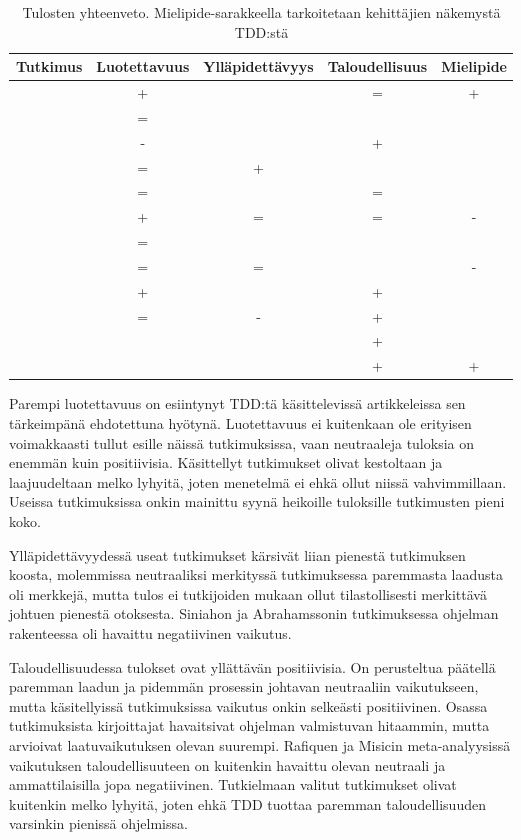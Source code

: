 \documentclass[finnish]{tktltiki2}
\theoremstyle{definition}
\theoremstyle{remark}
\begin{document}
\begin{table}
\begin{tabular}{ l  c  c  c  c}
\toprule
  Tutkimus & Luotettavuus & Ylläpidettävyys & Taloudellisuus & Mielipide \\
\midrule
\cite{George04} 	& + &  & = & + \\ 
\cite{Wilkerson12} 	& = &  &   &   \\ 
\cite{Erdogmus05} 	& - &  	& + &   \\ 
\cite{Causevic12} 	& = & + &   &   \\
\cite{Canfora06} 	& = &  & = &   \\ 
\cite{Pancur11} 	& + & = & = & - \\
\cite{Wilkerson12} 	& = &  &   &   \\ 
\cite{Munir14} 	& = & = &   & - \\ 
\cite{Nagappan08} 	& + &  & + &   \\ 
\cite{Siniaalto07} 	& = & - & + &   \\ 
\cite{Madeyski07} 	&   &   & + &   \\ 
\cite{Latorre14}	&   &   & + & + \\ 
\bottomrule
\end{tabular}
\caption{Tulosten yhteenveto. Mielipide-sarakkeella tarkoitetaan kehittäjien näkemystä TDD:stä}
\end{table}


Parempi luotettavuus on esiintynyt TDD:tä käsittelevissä artikkeleissa sen tärkeimpänä ehdotettuna hyötynä. Luotettavuus ei kuitenkaan ole erityisen voimakkaasti tullut esille näissä tutkimuksissa, vaan neutraaleja tuloksia on enemmän kuin positiivisia. Käsittellyt tutkimukset olivat  kestoltaan ja laajuudeltaan melko lyhyitä, joten menetelmä ei ehkä ollut niissä vahvimmillaan. Useissa tutkimuksissa onkin mainittu syynä heikoille tuloksille tutkimusten pieni koko. 

Ylläpidettävyydessä useat tutkimukset kärsivät liian pienestä tutkimuksen koosta, molemmissa neutraaliksi merkityssä tutkimuksessa paremmasta laadusta oli merkkejä, mutta tulos ei tutkijoiden mukaan ollut tilastollisesti merkittävä johtuen pienestä otoksesta. Siniahon ja Abrahamssonin tutkimuksessa ohjelman rakenteessa oli havaittu negatiivinen vaikutus.

Taloudellisuudessa tulokset ovat yllättävän positiivisia. On perusteltua päätellä paremman laadun ja pidemmän prosessin johtavan neutraaliin vaikutukseen, mutta käsitellyissä tutkimuksissa vaikutus onkin selkeästi positiivinen. Osassa tutkimuksista kirjoittajat havaitsivat ohjelman valmistuvan hitaammin, mutta arvioivat laatuvaikutuksen olevan suurempi. Rafiquen ja Misicin meta-analyysissä vaikutuksen taloudellisuuteen on kuitenkin havaittu olevan neutraali ja ammattilaisilla jopa negatiivinen. Tutkielmaan valitut tutkimukset olivat kuitenkin melko lyhyitä, joten ehkä TDD tuottaa paremman taloudellisuuden varsinkin pienissä ohjelmissa.
\end{document}
